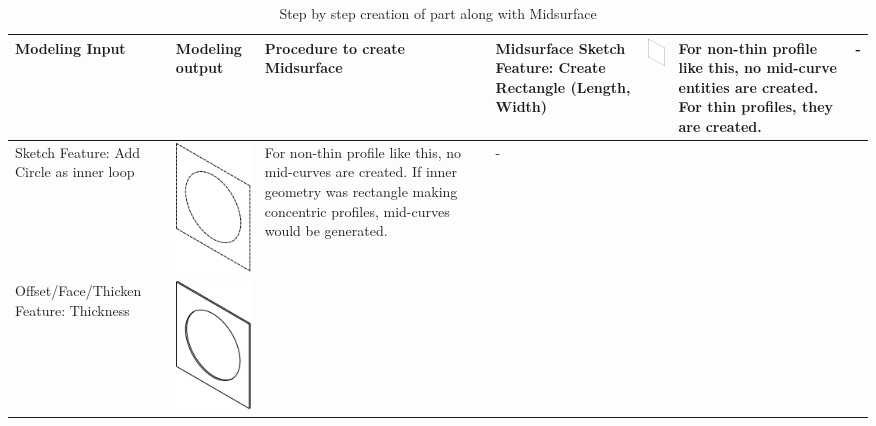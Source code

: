 \begin{longtable}{ L{0.18\textwidth} C{0.18\textwidth} L{0.38\textwidth}  C{0.18\textwidth}}
\caption{Step by step creation of part along with Midsurface}\\
\hline
{\bf Modeling Input} & {\bf Modeling output} & {\bf Procedure to create Midsurface} & {\bf Midsurface}\endhead
\hline
\hline
Sketch Feature:
Create Rectangle (Length, Width) &
\includegraphics[scale=0.3]{..//Common/images//DryRun1.png} &
For non-thin profile like this, no mid-curve entities are created. For thin profiles, they are created. &
- \\
\hline
Sketch Feature: Add Circle as inner loop &
\includegraphics[scale=0.3]{..//Common/images//DryRun2.png} &
For non-thin profile like this, no mid-curves are created. If inner geometry was rectangle making concentric profiles, mid-curves would be generated. &
- \\
\hline
Offset/Face/Thicken Feature: Thickness &
\includegraphics[scale=0.3]{..//Common/images//DryRun3.png} &

\end{longtable}
